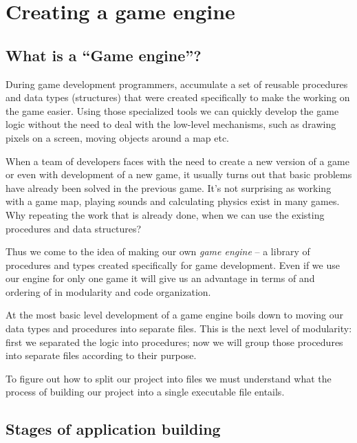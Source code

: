 \documentclass[../sparc.tex]{subfiles}
\begin{document}
\newpage
\section{Creating a game engine}

\subsection{What is a ``Game engine''?}

During game development programmers, accumulate a set of reusable procedures and
data types (structures) that were created specifically to make the working on
the game easier.  Using those specialized tools we can quickly develop the game
logic without the need to deal with the low-level mechanisms, such as drawing
pixels on a screen, moving objects around a map etc.

When a team of developers faces with the need to create a new version of a game
or even with development of a new game, it usually turns out that basic problems
have already been solved in the previous game.  It's not surprising as working
with a game map, playing sounds and calculating physics exist in many games.
Why repeating the work that is already done, when we can use the existing
procedures and data structures?

Thus we come to the idea of making our own \emph{game engine} -- a library of
procedures and types created specifically for game development.  Even if we use
our engine for only one game it will give us an advantage in terms of and
ordering of in modularity and code organization.

At the most basic level development of a game engine boils down to moving our
data types and procedures into separate files.  This is the next level of
modularity: first we separated the logic into procedures; now we will group
those procedures into separate files according to their purpose.

To figure out how to split our project into files we must understand what the
process of building our project into a single executable file entails.

\subsection{Stages of application building}
\end{document}
